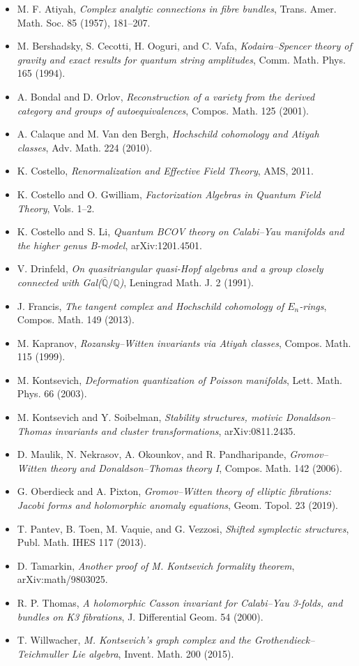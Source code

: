 \documentclass[11pt]{amsart}
\theoremstyle{definition}
\theoremstyle{remark}
\begin{document}
\begin{itemize}[leftmargin=1em,itemsep=1pt]
\item M. F. Atiyah, \emph{Complex analytic connections in fibre bundles},
Trans. Amer. Math. Soc. 85 (1957), 181--207.
\item M. Bershadsky, S. Cecotti, H. Ooguri, and C. Vafa,
\emph{Kodaira--Spencer theory of gravity and exact results for quantum
string amplitudes}, Comm. Math. Phys. 165 (1994).
\item A. Bondal and D. Orlov, \emph{Reconstruction of a variety from the
derived category and groups of autoequivalences}, Compos. Math. 125
(2001).
\item A. Calaque and M. Van den Bergh, \emph{Hochschild cohomology and
Atiyah classes}, Adv. Math. 224 (2010).
\item K. Costello, \emph{Renormalization and Effective Field Theory},
AMS, 2011.
\item K. Costello and O. Gwilliam, \emph{Factorization Algebras in
Quantum Field Theory}, Vols. 1--2.
\item K. Costello and S. Li, \emph{Quantum BCOV theory on Calabi--Yau
manifolds and the higher genus B-model}, arXiv:1201.4501.
\item V. Drinfeld, \emph{On quasitriangular quasi-Hopf algebras and a
group closely connected with Gal($\overline{\mathbb Q}/\mathbb Q$)},
Leningrad Math. J. 2 (1991).
\item J. Francis, \emph{The tangent complex and Hochschild cohomology of
$E_n$-rings}, Compos. Math. 149 (2013).
\item M. Kapranov, \emph{Rozansky--Witten invariants via Atiyah classes},
Compos. Math. 115 (1999).
\item M. Kontsevich, \emph{Deformation quantization of Poisson
manifolds}, Lett. Math. Phys. 66 (2003).
\item M. Kontsevich and Y. Soibelman, \emph{Stability structures,
motivic Donaldson--Thomas invariants and cluster transformations},
arXiv:0811.2435.
\item D. Maulik, N. Nekrasov, A. Okounkov, and R. Pandharipande,
\emph{Gromov--Witten theory and Donaldson--Thomas theory I}, Compos.
Math. 142 (2006).
\item G. Oberdieck and A. Pixton, \emph{Gromov--Witten theory of
elliptic fibrations: Jacobi forms and holomorphic anomaly equations},
Geom. Topol. 23 (2019).
\item T. Pantev, B. Toen, M. Vaquie, and G. Vezzosi, \emph{Shifted
symplectic structures}, Publ. Math. IHES 117 (2013).
\item D. Tamarkin, \emph{Another proof of M. Kontsevich formality
theorem}, arXiv:math/9803025.
\item R. P. Thomas, \emph{A holomorphic Casson invariant for
Calabi--Yau 3-folds, and bundles on K3 fibrations}, J. Differential
Geom. 54 (2000).
\item T. Willwacher, \emph{M. Kontsevich's graph complex and the
Grothendieck--Teichmuller Lie algebra}, Invent. Math. 200 (2015).
\end{itemize}
\end{document}
